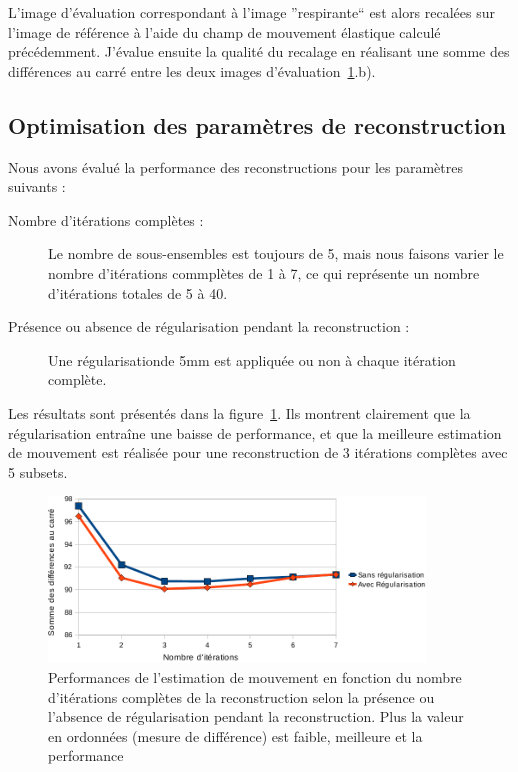 L'image d'évaluation correspondant à l'image ''respirante`` est alors recalées sur l'image de référence à l'aide du champ de mouvement élastique calculé précédemment. J'évalue ensuite la qualité du recalage en réalisant une somme des différences au carré entre les deux images d'évaluation~\ref{lab:perfsFctIterReg}.b).


\subsection{Optimisation des paramètres de reconstruction}


Nous avons évalué la performance des reconstructions pour les paramètres suivants :
\begin{description}
 \item[Nombre d'itérations complètes :] Le nombre de sous-ensembles est toujours de 5, mais nous faisons varier le nombre d'itérations commplètes de 1 à 7, ce qui représente un nombre d'itérations totales de 5 à 40.
 \item[Présence ou absence de régularisation pendant la reconstruction :] Une régularisationde 5mm  est appliquée ou non à chaque itération complète.
\end{description}

Les résultats sont présentés dans la figure~\ref{lab:perfsFctIterReg}. Ils montrent clairement que la régularisation entraîne une baisse de performance, et que la meilleure estimation de mouvement est réalisée pour une reconstruction de 3 itérations complètes avec 5 subsets.

\begin{figure}
\centering
\includegraphics[width=10cm]{images/perfsRecalageFctIter_crop}
\caption[Performances de l'estimation de mouvement en fonction de la réguilarisation]{Performances de l'estimation de mouvement en fonction du nombre d'itérations complètes de la reconstruction selon la présence ou l'absence de régularisation pendant la reconstruction. Plus la valeur en ordonnées (mesure de différence) est faible, meilleure et la performance}
\label{lab:perfsFctIterReg}
\end{figure}



